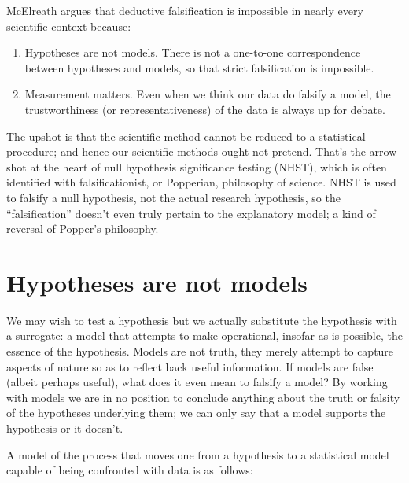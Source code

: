 \documentclass[
]{book}
\providecommand{\tightlist}{%
  \setlength{\itemsep}{0pt}\setlength{\parskip}{0pt}}
\begin{document}
McElreath argues that deductive falsification is impossible in nearly every scientific context because:

\begin{enumerate}
\def\labelenumi{\arabic{enumi}.}
\tightlist
\item
  Hypotheses are not models. There is not a one-to-one correspondence between hypotheses and models, so that strict falsification is impossible.
\item
  Measurement matters. Even when we think our data do falsify a model, the trustworthiness (or representativeness) of the data is always up for debate.
\end{enumerate}

The upshot is that the scientific method cannot be reduced to a statistical procedure; and hence our scientific methods ought not pretend. That's the arrow shot at the heart of null hypothesis significance testing (NHST), which is often identified with falsificationist, or Popperian, philosophy of science. NHST is used to falsify a null hypothesis, not the actual research hypothesis, so the ``falsification'' doesn't even truly pertain to the explanatory model; a kind of reversal of Popper's philosophy.

\hypertarget{hypotheses-are-not-models}{%
\section{Hypotheses are not models}\label{hypotheses-are-not-models}}

We may wish to test a hypothesis but we actually substitute the hypothesis with a surrogate: a model that attempts to make operational, insofar as is possible, the essence of the hypothesis. Models are not truth, they merely attempt to capture aspects of nature so as to reflect back useful information. If models are false (albeit perhaps useful), what does it even mean to falsify a model? By working with models we are in no position to conclude anything about the truth or falsity of the hypotheses underlying them; we can only say that a model supports the hypothesis or it doesn't.

A model of the process that moves one from a hypothesis to a statistical model capable of being confronted with data is as follows:
\end{document}
